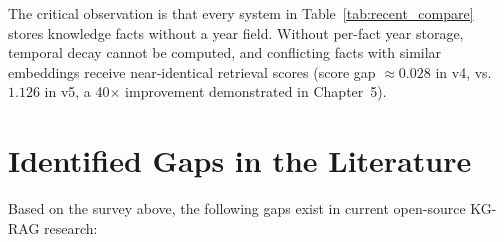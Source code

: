 \begin{table}[H]
\centering
\caption{Comparison with recent state-of-the-art systems (2023--2025)}
\label{tab:recent_compare}
\end{table}

The critical observation is that every system in Table~\ref{tab:recent_compare}
stores knowledge facts without a year field.
Without per-fact year storage, temporal decay cannot be computed, and conflicting
facts with similar embeddings receive near-identical retrieval scores
(score gap $\approx 0.028$ in v4, vs.\ $1.126$ in v5, a 40$\times$ improvement
demonstrated in Chapter~5).

\section{Identified Gaps in the Literature}

Based on the survey above, the following gaps exist in current open-source
KG-RAG research:

